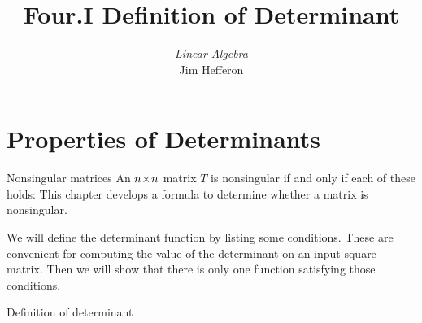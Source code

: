 \documentclass[10pt,t]{beamer}
\title[Determinants] %
{Four.I Definition of Determinant}
\author{\textit{Linear Algebra} \\ {\small Jim Hef{}feron}}
\institute{
  \texttt{http://joshua.smcvt.edu/linearalgebra}
}
\date{}
\begin{document}
\begin{frame}
  \titlepage
\end{frame}




\section{Properties of Determinants}
\begin{frame}{Nonsingular matrices}
\noindent An \( n \! \times \! n \) matrix \( T \) is nonsingular if and only if
each of these holds:%
This chapter develops a formula to determine whether a
matrix is nonsingular.
\end{frame}




\begin{frame}
\end{frame}




\begin{frame}
We will define the determinant function by listing 
some conditions.
These are convenient for computing the value of the determinant
on an input square matrix. 
Then we will show that there is only one function satisfying those
conditions.

\end{frame}




\begin{frame}{Definition of determinant}

\pause 
{}%
\end{frame}
\end{document}

